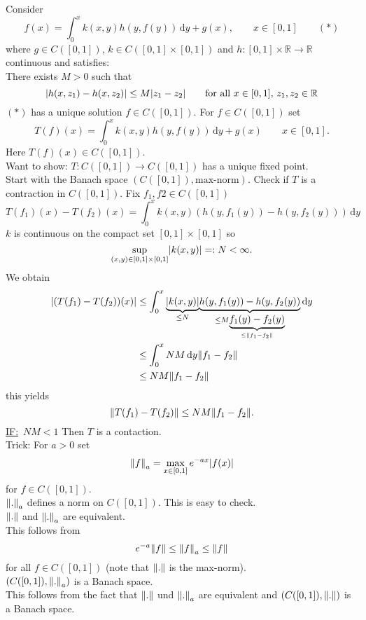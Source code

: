 \begin{beispiel}
	Consider
	\[
		f(x) = \int_{0}^{x}k(x,y)h(y,f(y)) \,\mathrm{d}y + g(x), \qquad x \in [0,1] \qquad (*)
	\]
	where $g \in C([0,1])$, $k \in C([0,1] \times [0,1])$ and $h: [0,1] \times \mathbb{R} \to \mathbb{R}$ continuous and satisfies: \\
	There exists $M>0$ such that
	\[
		\lvert h(x,z_1)-h(x,z_2)\rvert \leq M \lvert z_1- z_2\rvert \qquad \text{for all }x \in [0,1],\,z_1,z_2 \in \mathbb{R}
	\]
	$(*)$ has a unique solution $f \in C([0,1])$. For $f \in C([0,1])$ set
	\[
		T(f)(x) = \int_{0}^{x}k(x,y)h(y,f(y)) \,\mathrm{d}y + g(x) \qquad x \in [0,1].
	\]
	Here $T(f)(x) \in C([0,1])$. \\ Want to show: $T: C([0,1]) \to C([0,1])$ has a unique fixed point. \\
	Start with the Banach space $(C([0,1]), \text{max-norm})$. Check if $T$ is a contraction in $C([0,1])$. Fix $f_1,f2 \in C([0,1])$
	\[
		T(f_1)(x)- T(f_2)(x) = \int_{0}^{x} k(x,y)(h(y,f_1(y))-h(y,f_2(y))) \,\mathrm{d}y
	\] 
	$k$ is continuous on the compact set $[0,1] \times [0,1]$ so 
	\[
		\sup\limits_{(x,y) \in [0,1]\times[0,1]} \lvert k(x,y)\rvert =: N < \infty.
	\]
	We obtain 
	\begin{align*}
		\abs{(T(f_1)-T(f_2))(x)} &\leq \int_{0}^{x} \underset{\leq N}{\underbrace{\abs{k(x,y)}}}\underset{\leq M \underset{\leq \norm{f_1-f_2}}{\underbrace{f_1(y)-f_2(y)}}}{\underbrace{h(y,f_1(y))-h(y,f_2(y))}} \,\mathrm{d}y \\ & \leq \int_{0}^{x}NM \,\mathrm{d}y \norm{f_1-f_2} \\& \leq NM \norm{f_1-f_2}
		\end{align*}
	this yields
	\[
		\norm{T(f_1)-T(f_2)} \leq NM \norm{f_1-f_2}.
	\]
	\underline{IF:} \,$NM<1$ Then $T$ is a contaction. \\ Trick: For $a >0$ set 
	\[
		\norm{f}_a = \max\limits_{x \in [0,1]} e^{-ax}\abs{f(x)}
	\] 
	for $f \in C([0,1])$. \\
	$\norm{.}_a$ defines a norm on $C([0,1])$. This is easy to check. \\
	$\norm{.}$ and $\norm{.}_a$ are equivalent. \\
	This follows from
	\[
		e^{-a} \norm{f} \leq \norm{f}_a \leq \norm{f}
	\]
	for all $f \in C([0,1])$ (note that $\norm{.}$ is the max-norm).\\
	$(C([0,1]), \norm{.}_a)$ is a Banach space. \\
	This follows from the fact that $\norm{.}$ und $\norm{.}_a$ are equivalent and $(C([0,1]),\norm{.})$ is a Banach space. \\

\end{beispiel}
